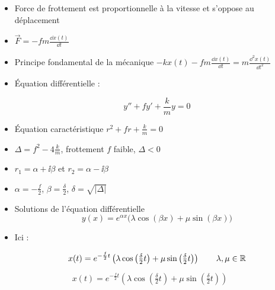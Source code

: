 \begin{frame}


\pause

\begin{itemize}[<+->]
  \item Force de frottement est proportionnelle 
  à la vitesse et s'oppose au déplacement
  
  \item  $\vec F =  -fm \frac{\dd x(t)}{\dd t}$
  
  \item Principe fondamental de la mécanique $-kx(t)-fm \frac{\dd x(t)}{\dd t} = m\frac{\dd^2 x(t)}{\dd t^2}$
  
  \item \'Equation différentielle : 
   
  \vspace*{-3ex} 
  $$y'' + f y' + \frac{k}{m} y = 0$$

  \item \'Equation caractéristique $r^2+fr+\frac{k}{m}=0$
  
  \item $\Delta = f^2-4\frac{k}{m}$, frottement $f$ faible, $\Delta <0$
  
  \item $r_1 = \alpha + \ii \beta$ et $r_2 = \alpha - \ii \beta$
  
  \item $\alpha = -\frac{f}{2}$, $\beta = \frac{\delta}{2}$, 
  $\delta = \sqrt{|\Delta|}$
  
  \item Solutions de l'équation différentielle
$$y(x) = e^{\alpha x}\big(\lambda\cos (\beta x)+\mu\sin (\beta x)\big)$$

  \item Ici :
  
  \vspace*{-3ex}
$$x(t) = e^{-\frac{f}{2} t}\left(\lambda\cos \left(\tfrac{\delta}{2}t\right)
+\mu\sin \left(\tfrac{\delta}{2}t\right)\right)\qquad \lambda, \mu \in \mathbb{R}$$
\end{itemize}

\end{frame}


\begin{frame}



$$x(t) = e^{-\frac{f}{2} t}\left(\lambda\cos \left(\tfrac{\delta}{2}t\right)
+\mu\sin \left(\tfrac{\delta}{2}t\right)\right)$$

  
\end{frame}



